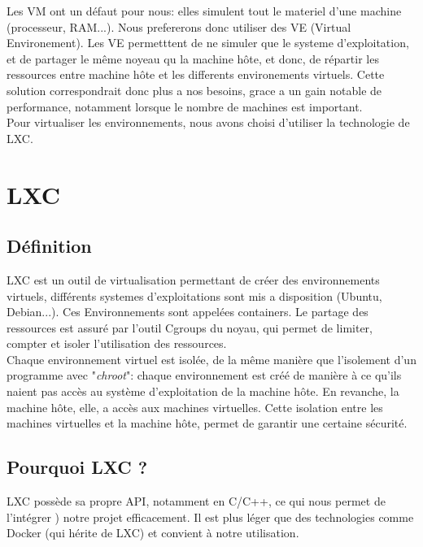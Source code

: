 \documentclass[a4paper]{article}
\begin{document}
Les VM ont un d\'efaut pour nous: elles simulent tout le materiel d'une machine (processeur, RAM...).
Nous prefererons donc utiliser des VE (Virtual Environement). Les VE permetttent de ne simuler que le
systeme d'exploitation, et de partager le m\^eme noyeau qu la machine h\^ote, et donc, de r\'epartir les
ressources entre machine h\^ote et les differents environements virtuels. Cette solution correspondrait donc
plus a nos besoins, grace a un gain notable de performance, notamment lorsque le nombre de machines est
important.\\

Pour virtualiser les environnements, nous avons choisi d'utiliser la technologie de LXC.

\section{LXC}
\subsection{D\'efinition}

LXC est un outil de virtualisation permettant de cr\'eer des environnements virtuels, diff\'erents systemes
d'exploitations sont mis a disposition (Ubuntu, Debian...). Ces Environnements sont appel\'ees containers. Le
partage des ressources est assur\'e par l'outil Cgroups du noyau, qui permet de limiter, compter et
isoler l'utilisation des ressources.\\

Chaque environnement virtuel est isol\'ee, de la m\^eme mani\`ere que l'isolement d'un programme 
avec "\emph{chroot}": chaque environnement est cr\'e\'e de mani\`ere \`a ce qu'ils naient pas acc\`es au syst\`eme 
d'exploitation de la machine h\^ote. En revanche, la machine h\^ote, elle, a acc\`es aux machines virtuelles.
Cette isolation entre les machines virtuelles et la machine h\^ote, permet de garantir une certaine s\'ecurit\'e.\\

\subsection{Pourquoi LXC ?}

LXC poss\`ede sa propre API, notamment en C/C++, ce qui nous permet de l'int\'egrer ) notre projet efficacement.
Il est plus l\'eger que des technologies comme Docker (qui h\'erite de LXC) et convient \`a notre utilisation.
\end{document}

